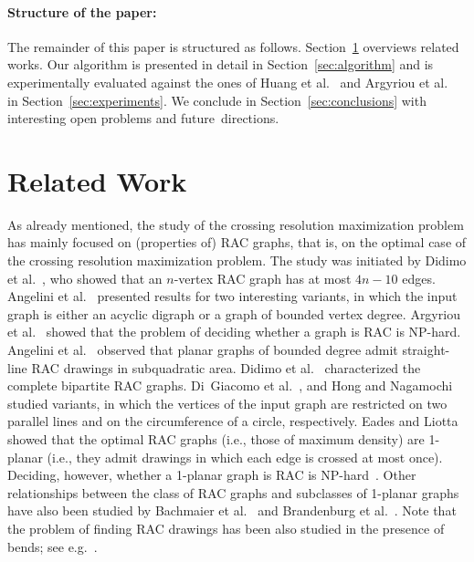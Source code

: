 \documentclass[runningheads]{llncs}
\begin{document}
\paragraph{Structure of the paper:}
The remainder of this paper is structured as follows. Section~\ref{sec:relatedwork} overviews related works. 
Our algorithm is presented in detail in Section~\ref{sec:algorithm} and is experimentally evaluated against the ones of Huang et al.~\cite{DBLP:journals/vlc/HuangEHL13} and Argyriou et al.~\cite{DBLP:journals/cj/ArgyriouBS13} in Section~\ref{sec:experiments}. We conclude in Section~\ref{sec:conclusions} with interesting open problems and future~directions.
 
\section{Related Work}
\label{sec:relatedwork}

As already mentioned, the study of the crossing resolution maximization problem has mainly focused on (properties of) RAC graphs, that is, on the optimal case of the crossing resolution maximization problem. The study was initiated by Didimo et al.~\cite{DBLP:journals/tcs/DidimoEL11}, who showed that an $n$-vertex RAC graph has at most $4n-10$ edges. 
Angelini et al.~\cite{DBLP:journals/jgaa/AngeliniCDFBKS11} presented results for two interesting variants, in which the input graph is either an acyclic digraph or a graph of bounded vertex degree. Argyriou et al.~\cite{DBLP:journals/jgaa/ArgyriouBS12} showed that the problem of deciding whether a graph is RAC is NP-hard. Angelini et al.~\cite{DBLP:conf/s-egc/AngeliniBDFHKLL11} observed that planar graphs of bounded degree admit straight-line RAC drawings in subquadratic area. Didimo et al.~\cite{DBLP:journals/ipl/DidimoEL10} characterized the complete bipartite RAC graphs.
Di~Giacomo et al.~\cite{DBLP:journals/algorithmica/GiacomoDEL14}, and Hong and Nagamochi~\cite{DBLP:conf/wg/HongN15} studied variants, in which the vertices of the input graph are restricted on two parallel lines and on the circumference of a circle, respectively. Eades and Liotta~\cite{DBLP:journals/dam/EadesL13} showed that the optimal RAC graphs (i.e., those of maximum density) are 1-planar (i.e., they admit drawings in which each edge is crossed at most once). Deciding, however, whether a 1-planar graph is RAC is NP-hard~\cite{DBLP:journals/tcs/BekosDLMM17}. Other relationships between the class of RAC graphs and subclasses of 1-planar graphs have also been studied by Bachmaier et al.~\cite{DBLP:journals/dam/BachmaierBHNR17} and Brandenburg et al.~\cite{DBLP:journals/tcs/BrandenburgDEKL16}. Note that the problem of finding RAC drawings has been also studied in the presence of bends; see e.g.~\cite{DBLP:journals/jgaa/AngeliniCDFBKS11,DBLP:journals/comgeo/ArikushiFKMT12,DBLP:journals/tcs/DidimoEL11,DBLP:journals/mst/GiacomoDLM11}. 
\end{document}
